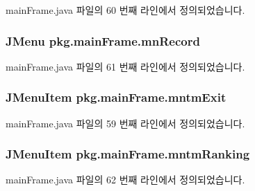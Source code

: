 main\+Frame.\+java 파일의 60 번째 라인에서 정의되었습니다.

\subsubsection[{\texorpdfstring{mn\+Record}{mnRecord}}]{\setlength{\rightskip}{0pt plus 5cm}J\+Menu pkg.\+main\+Frame.\+mn\+Record\hspace{0.3cm}{\ttfamily [private]}}\hypertarget{classpkg_1_1main_frame_adf7d30ed5ce4e5567e4228efaf962161}{}\label{classpkg_1_1main_frame_adf7d30ed5ce4e5567e4228efaf962161}


main\+Frame.\+java 파일의 61 번째 라인에서 정의되었습니다.

\subsubsection[{\texorpdfstring{mntm\+Exit}{mntmExit}}]{\setlength{\rightskip}{0pt plus 5cm}J\+Menu\+Item pkg.\+main\+Frame.\+mntm\+Exit\hspace{0.3cm}{\ttfamily [private]}}\hypertarget{classpkg_1_1main_frame_ab5c36db42de946a49e1955e4e6bdfd6b}{}\label{classpkg_1_1main_frame_ab5c36db42de946a49e1955e4e6bdfd6b}


main\+Frame.\+java 파일의 59 번째 라인에서 정의되었습니다.

\subsubsection[{\texorpdfstring{mntm\+Ranking}{mntmRanking}}]{\setlength{\rightskip}{0pt plus 5cm}J\+Menu\+Item pkg.\+main\+Frame.\+mntm\+Ranking\hspace{0.3cm}{\ttfamily [private]}}\hypertarget{classpkg_1_1main_frame_a998c4b1062e1b23bc0cbfe05a12fa138}{}\label{classpkg_1_1main_frame_a998c4b1062e1b23bc0cbfe05a12fa138}


main\+Frame.\+java 파일의 62 번째 라인에서 정의되었습니다.


